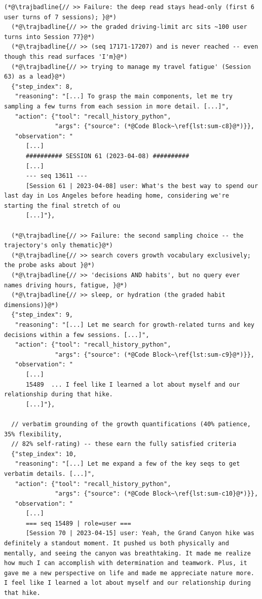 \begin{lstlisting}[style=traj]
  (*@\trajbadline{// >> Failure: the deep read stays head-only (first 6 user turns of 7 sessions); }@*)
  (*@\trajbadline{// >> the graded driving-limit arc sits ~100 user turns into Session 77}@*)
  (*@\trajbadline{// >> (seq 17171-17207) and is never reached -- even though this read surfaces 'I'm}@*)
  (*@\trajbadline{// >> trying to manage my travel fatigue' (Session 63) as a lead}@*)
  {"step_index": 8,
   "reasoning": "[...] To grasp the main components, let me try sampling a few turns from each session in more detail. [...]",
   "action": {"tool": "recall_history_python",
              "args": {"source": (*@Code Block~\ref{lst:sum-c8}@*)}},
   "observation": "
      [...]
      ########## SESSION 61 (2023-04-08) ##########
      [...]
      --- seq 13611 ---
      [Session 61 | 2023-04-08] user: What's the best way to spend our last day in Los Angeles before heading home, considering we're starting the final stretch of ou
      [...]"},

  (*@\trajbadline{// >> Failure: the second sampling choice -- the trajectory's only thematic}@*)
  (*@\trajbadline{// >> search covers growth vocabulary exclusively; the probe asks about }@*)
  (*@\trajbadline{// >> 'decisions AND habits', but no query ever names driving hours, fatigue, }@*)
  (*@\trajbadline{// >> sleep, or hydration (the graded habit dimensions)}@*)
  {"step_index": 9,
   "reasoning": "[...] Let me search for growth-related turns and key decisions within a few sessions. [...]",
   "action": {"tool": "recall_history_python",
              "args": {"source": (*@Code Block~\ref{lst:sum-c9}@*)}},
   "observation": "
      [...]
      15489  ... I feel like I learned a lot about myself and our relationship during that hike.
      [...]"},

  // verbatim grounding of the growth quantifications (40% patience, 35% flexibility, 
  // 82% self-rating) -- these earn the fully satisfied criteria
  {"step_index": 10,
   "reasoning": "[...] Let me expand a few of the key seqs to get verbatim details. [...]",
   "action": {"tool": "recall_history_python",
              "args": {"source": (*@Code Block~\ref{lst:sum-c10}@*)}},
   "observation": "
      [...]
      === seq 15489 | role=user ===
      [Session 70 | 2023-04-15] user: Yeah, the Grand Canyon hike was definitely a standout moment. It pushed us both physically and mentally, and seeing the canyon was breathtaking. It made me realize how much I can accomplish with determination and teamwork. Plus, it gave me a new perspective on life and made me appreciate nature more. I feel like I learned a lot about myself and our relationship during that hike.



\end{lstlisting}
